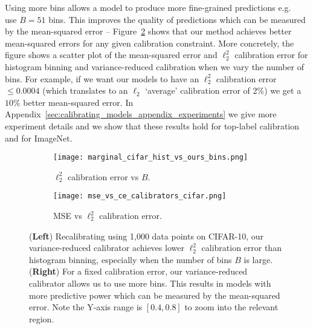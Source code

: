 Using more bins allows a model to produce more fine-grained predictions e.g.~\cite{brocker2012empirical} use $B = 51$ bins. This improves the quality of predictions which can be measured by the mean-squared error -- Figure~\ref{fig:cifar_calibrator_cmp_mse_ce} shows that our method achieves better mean-squared errors for any given calibration constraint. More concretely, the figure shows a scatter plot of the mean-squared error and $\ell_2^2$ calibration error for histogram binning and variance-reduced calibration when we vary the number of bins. For example, if we want our models to have an $\ell_2^2$ calibration error $\leq 0.0004$ (which translates to an $\ell_2$ `average' calibration error of 2\%) we get a $10\%$ better mean-squared error. In Appendix~\ref{sec:calibrating_models_appendix_experiments} we give more experiment details and we show that these results hold for top-label calibration and for ImageNet.

\begin{figure}
  \centering
  \centering
     \begin{subfigure}[b]{0.55\textwidth}
         \centering
         \texttt{[image: marginal\_cifar\_hist\_vs\_ours\_bins.png]}
         \caption{$\ell_2^2$ calibration error vs $B$. }
         \label{fig:marginal_calibrator_comparison_cifar}
     \end{subfigure}
     \hfill
     \begin{subfigure}[b]{0.4\textwidth}
         \centering
         \texttt{[image: mse\_vs\_ce\_calibrators\_cifar.png]}
         \caption{MSE vs $\ell_2^2$ calibration error. }
         \label{fig:cifar_calibrator_cmp_mse_ce}
     \end{subfigure}
  \caption{
  (\textbf{Left}) Recalibrating using 1,000 data points on CIFAR-10, our variance-reduced calibrator achieves lower $\ell_2^2$ calibration error than histogram binning, especially when the number of bins $B$ is large.
  (\textbf{Right}) For a fixed calibration error, our variance-reduced calibrator allows us to use more bins. This results in models with more predictive power which can be measured by the mean-squared error. Note the Y-axis range is $[0.4, 0.8]$ to zoom into the relevant region.
  }
  \label{fig:nan2}
\end{figure}



